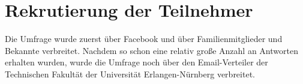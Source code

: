 \section{Rekrutierung der Teilnehmer}
Die Umfrage wurde zuerst über Facebook und über Familienmitglieder und Bekannte verbreitet. Nachdem so schon eine relativ große Anzahl an Antworten erhalten wurden, wurde die Umfrage noch über den Email-Verteiler der Technischen Fakultät der Universität Erlangen-Nürnberg verbreitet.